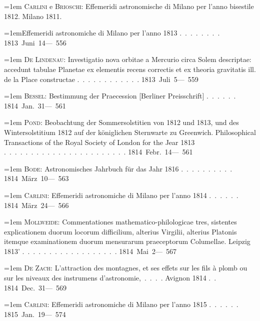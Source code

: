 \noindent\hangindent=1em \textsc{Carlini} e \textsc{Brioschi}: Effemeridi astronomische di Milano per l'anno bisestile 1812. Milano 1811.\par\noindent\hangindent=1em\hspace{1em}Effemeridi astronomiche di Milano per l'anno 1813 \mbox{.\ .\ .\ .\ .\ .\ .\ .} \hfill\mbox{1813 Juni 14}\quad\mbox{--- 556}\par\smallskip
\noindent\hangindent=1em \textsc{De Lindenau}: Investigatio nova orbitae a Mercurio circa Solem descriptae: accedunt tabulae Planetae ex elementis recens correctis et ex theoria gravitatis ill. de la Place constructae \mbox{.\ .\ .\ .\ .\ .\ .\ .\ .\ .\ .\ .} \hfill\mbox{1813 Juli 5}\quad\mbox{--- 559}\par\smallskip
\noindent\hangindent=1em \textsc{Bessel}: Bestimmung der Praecession [Berliner Preisschrift] \mbox{.\ .\ .\ .\ .\ .} \hfill\mbox{1814 Jan. 31}\quad\mbox{--- 561}\par\smallskip
\noindent\hangindent=1em \textsc{Pond}: Beobachtung der Sommersolstitien von 1812 und 1813, und des Wintersolstitium 1812 auf der königlichen Sternwarte zu Greenwich. Philosophical Transactions of the Royal Society of London for the Jear 1813 \mbox{.\ .\ .\ .\ .\ .\ .\ .\ .\ .\ .\ .\ .\ .\ .\ .\ .\ .\ .\ .\ .\ .\ .} \hfill\mbox{1814 Febr. 14}\quad\mbox{--- 561}\par\smallskip
\noindent\hangindent=1em \textsc{Bode}: Astronomisches Jahrbuch für das Jahr 1816 \mbox{.\ .\ .\ .\ .\ .\ .\ .\ .\ .} \hfill\mbox{1814 März 10}\quad\mbox{--- 563}\par\smallskip
\noindent\hangindent=1em \textsc{Carlini}: Effemeridi astronomiche di Milano per l'anno 1814 \mbox{.\ .\ .\ .\ .\ .} \hfill\mbox{1814 März 24}\quad\mbox{--- 566}\par\smallskip
\noindent\hangindent=1em \textsc{Mollweide}: Commentationes mathematico-philologicae tres, sistentes explicationem duorum locorum difficilium, alterius Virgilii, alterius Platonis itemque examinationem duorum mensurarum praeceptorum Columellae. Leipzig 1813' \mbox{.\ .\ .\ .\ .\ .\ .\ .\ .\ .\ .\ .\ .\ .\ .\ .\ .\ .} \hfill\mbox{1814 Mai 2}\quad\mbox{--- 567}\par\smallskip
\noindent\hangindent=1em \textsc{De Zach}: L'attraction des montagnes, et ses effets sur les fils à plomb ou sur les niveaux des instrumens d'astronomie,\ .\ .\ .\ . Avignon 1814 \mbox{.\ .} \hfill\mbox{1814 Dec. 31}\quad\mbox{--- 569}\par\smallskip
\noindent\hangindent=1em \textsc{Carlini}: Effemeridi astronomiche di Milano per l'anno 1815 \mbox{.\ .\ .\ .\ .\ .} \hfill\mbox{1815 Jan. 19}\quad\mbox{--- 574}\par\smallskip
